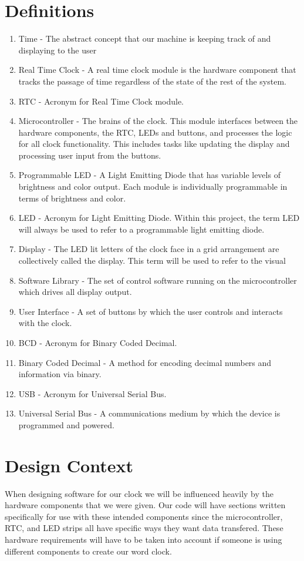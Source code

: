 \documentclass[10pt,draftclsnofoot,onecolumn]{IEEEtran}
\begin{document}
\section{Definitions}
\begin{enumerate}[]
  \item Time - The abstract concept that our machine is keeping track of and displaying to the user
  \item Real Time Clock - A real time clock module is the hardware component that tracks the passage
  of time regardless of the state of the rest of the system.
  \item RTC - Acronym for Real Time Clock module.
  \item Microcontroller - The brains of the clock. This module interfaces between the hardware
  components, the RTC, LEDs and buttons, and processes the logic for all clock functionality.
  This includes tasks like updating the display and processing user input from the buttons.
  \item Programmable LED - A Light Emitting Diode that has variable levels of brightness and
  color output. Each module is individually programmable in terms of brightness and color.
  \item LED - Acronym for Light Emitting Diode. Within this project, the term LED will always
  be used to refer to a programmable light emitting diode.
  \item Display - The LED lit letters of the clock face in a grid arrangement are collectively
  called the display. This term will be used to refer to the visual
  \item Software Library - The set of control software running on the microcontroller which drives all display output.
  \item User Interface - A set of buttons by which the user controls and interacts with the clock.
  \item BCD - Acronym for Binary Coded Decimal.
  \item Binary Coded Decimal - A method for encoding decimal numbers and information via binary.
  \item USB - Acronym for Universal Serial Bus.
  \item Universal Serial Bus - A communications medium by which the device is programmed and  powered.
\end{enumerate}

\newpage

\section{Design Context}
When designing software for our clock we will be influenced heavily by the hardware components that we were given. Our code will have sections written specifically for use with these intended components since the microcontroller, RTC, and LED strips all have specific ways they want data transfered. These hardware requirements will have to be taken into account if someone is using different components to create our word clock.
\end{document}
